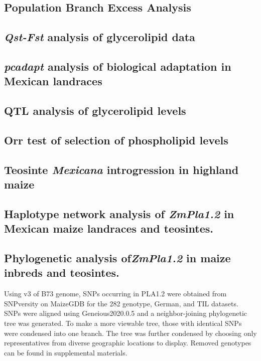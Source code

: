 \documentclass[9pt,twocolumn,twoside,lineno]{gsajnl}
\begin{document}
\subsection{Population Branch Excess Analysis}

\subsection{\textit{Qst-Fst} analysis of glycerolipid data}

\subsection{\textit{pcadapt} analysis of biological adaptation in Mexican landraces}

\subsection{QTL analysis of glycerolipid levels}

\subsection{Orr test of selection of phospholipid levels}

\subsection{Teosinte \textit{Mexicana} introgression in highland maize}

\subsection{Haplotype network analysis of \textit{ZmPla1.2} in Mexican maize landraces and teosintes.}

\subsection{Phylogenetic analysis of\textit{ZmPla1.2} in maize inbreds and teosintes.}
Using v3 of B73 genome, SNPs occurring in PLA1.2 were obtained from SNPversity on MaizeGDB for the 282 genotype, German, and TIL datasets. SNPs were aligned using Geneious2020.0.5 and a neighbor-joining phylogenetic tree was generated. To make a more viewable tree, those with identical SNPs were condensed into one branch. The tree was further condensed by choosing only representatives from diverse geographic locations to display. Removed genotypes can be found in supplemental materials. 
\end{document}
